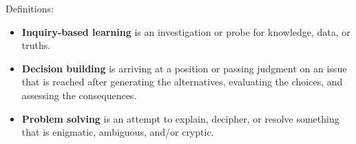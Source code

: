 \documentclass[a4]{book}
\begin{document}
\vspace*{0.2cm}
Definitions:\\

\vspace*{0.2cm}
\begin{itemize}
  \item \textbf{Inquiry-based learning} is an investigation or probe for knowledge, data, or truths.\\

  \vspace*{0.2cm}
  \item \textbf{Decision building} is arriving at a position or passing judgment on an issue that is reached after generating the alternatives, evaluating the choices, and assessing the consequences.\\

      \vspace*{0.2cm}
  \item \textbf{Problem solving} is an attempt to explain, decipher, or resolve something that is enigmatic, ambiguous, and/or cryptic.\\
\end{itemize}
\end{document}
